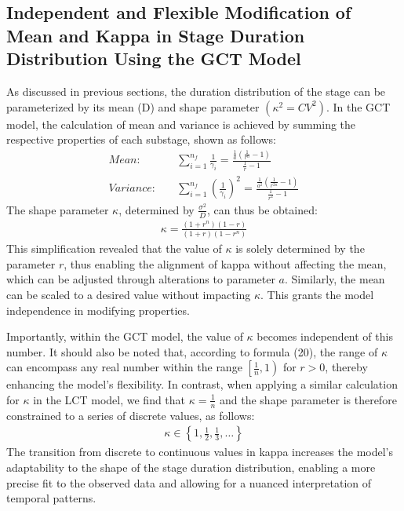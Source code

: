 \documentclass[12pt]{article}
\begin{document}
\subsection{Independent and Flexible Modification of Mean and Kappa in Stage Duration Distribution Using the GCT Model}
As discussed in previous sections, the duration distribution of the stage can be parameterized by its mean (D) and shape parameter $(\kappa^2 = CV^2)$. In the GCT model, the calculation of mean and variance is achieved by summing the respective properties of each substage, shown as follows:
\begin{align}
    Mean: \quad  &\sum_{i=1}^{n_f} \frac{1}{\gamma_i} = \frac{\frac{1}{a} (\frac{1}{r^n} - 1)}{\frac{1}{r} -1} \\
    Variance: \quad &\sum_{i=1}^{n_f} \left(\frac{1}{\gamma_i} \right)^2 = \frac{\frac{1}{a^2} (\frac{1}{r^{2n}} - 1)}{\frac{1}{r^2} -1}
\end{align}
The shape parameter $\kappa$, determined by $\frac{\sigma^2}{D}$, can thus be obtained:
\begin{align}
    \kappa = \frac{(1+r^{n}) (1-r)}{(1+r) (1-r^{n})}
\end{align}
This simplification revealed that the value of $\kappa$ is solely determined by the parameter $r$, thus enabling the alignment of kappa without affecting the mean, which can be adjusted through alterations to parameter $a$. Similarly, the mean can be scaled to a desired value without impacting $\kappa$. This grants the model independence in modifying properties.

Importantly, within the GCT model, the value of $\kappa$ becomes independent of this number. It should also be noted that, according to formula (20), the range of $\kappa$ can encompass any real number within the range $\left[ \frac{1}{n}, 1 \right)$ for $r > 0$, thereby enhancing the model's flexibility. In contrast, when applying a similar calculation for $\kappa$ in the LCT model, we find that $\kappa = \frac{1}{n}$ and the shape parameter is therefore constrained to a series of discrete values, as follows:
\begin{align*}
    \kappa \in \left\{ 1, \frac{1}{2}, \frac{1}{3}, \dots \right\}
\end{align*}
The transition from discrete to continuous values in kappa increases the model's adaptability to the shape of the stage duration distribution, enabling a more precise fit to the observed data and allowing for a nuanced interpretation of temporal patterns.
\end{document}
